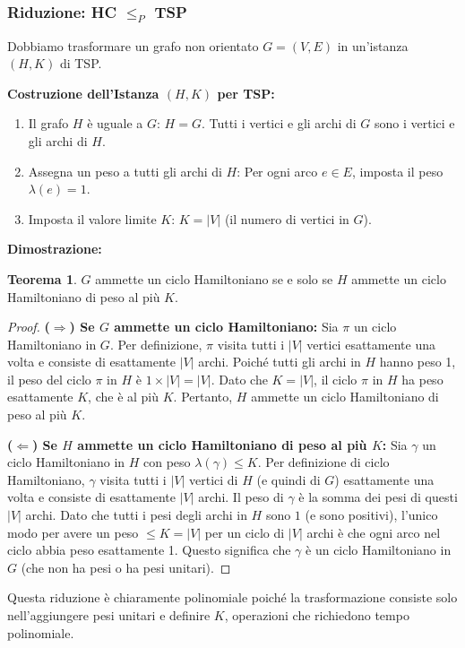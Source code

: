 \documentclass[a4paper]{article}
\theoremstyle{definition} %
\newtheorem{theorem}{Teorema}
\begin{document}
\subsubsection{Riduzione: HC $\le_P$ TSP}

Dobbiamo trasformare un grafo non orientato $G=(V, E)$ in un'istanza $(H, K)$ di TSP.

\textbf{Costruzione dell'Istanza $(H, K)$ per TSP:}
\begin{enumerate}
    \item Il grafo $H$ è uguale a $G$: $H=G$. Tutti i vertici e gli archi di $G$ sono i vertici e gli archi di $H$.
    \item Assegna un peso a tutti gli archi di $H$: Per ogni arco $e \in E$, imposta il peso $\lambda(e)=1$.
    \item Imposta il valore limite $K$: $K=|V|$ (il numero di vertici in $G$).
\end{enumerate}

\textbf{Dimostrazione:}
\begin{theorem}
$G$ ammette un ciclo Hamiltoniano se e solo se $H$ ammette un ciclo Hamiltoniano di peso al più $K$.
\end{theorem}
\begin{proof}
\textbf{($\Rightarrow$) Se $G$ ammette un ciclo Hamiltoniano:}
Sia $\pi$ un ciclo Hamiltoniano in $G$. Per definizione, $\pi$ visita tutti i $|V|$ vertici esattamente una volta e consiste di esattamente $|V|$ archi.
Poiché tutti gli archi in $H$ hanno peso 1, il peso del ciclo $\pi$ in $H$ è $1 \times |V| = |V|$.
Dato che $K=|V|$, il ciclo $\pi$ in $H$ ha peso esattamente $K$, che è al più $K$.
Pertanto, $H$ ammette un ciclo Hamiltoniano di peso al più $K$.

\textbf{($\Leftarrow$) Se $H$ ammette un ciclo Hamiltoniano di peso al più $K$:}
Sia $\gamma$ un ciclo Hamiltoniano in $H$ con peso $\lambda(\gamma) \le K$.
Per definizione di ciclo Hamiltoniano, $\gamma$ visita tutti i $|V|$ vertici di $H$ (e quindi di $G$) esattamente una volta e consiste di esattamente $|V|$ archi.
Il peso di $\gamma$ è la somma dei pesi di questi $|V|$ archi. Dato che tutti i pesi degli archi in $H$ sono $1$ (e sono positivi), l'unico modo per avere un peso $\le K=|V|$ per un ciclo di $|V|$ archi è che ogni arco nel ciclo abbia peso esattamente 1.
Questo significa che $\gamma$ è un ciclo Hamiltoniano in $G$ (che non ha pesi o ha pesi unitari).
\end{proof}

Questa riduzione è chiaramente polinomiale poiché la trasformazione consiste solo nell'aggiungere pesi unitari e definire $K$, operazioni che richiedono tempo polinomiale.
\end{document}
